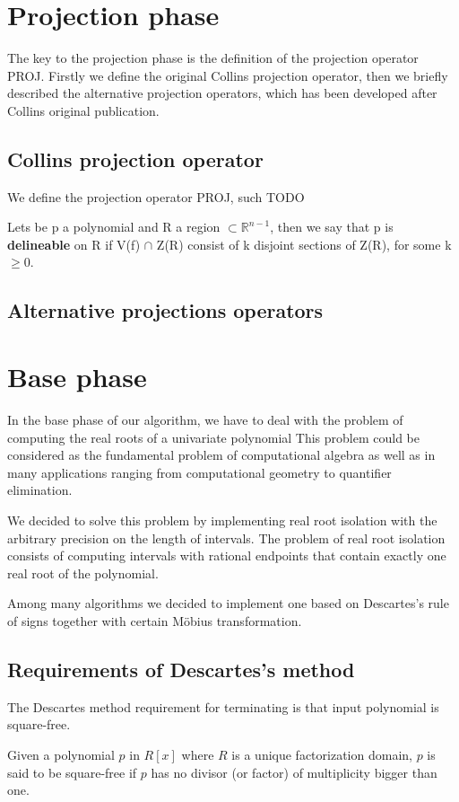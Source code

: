 \documentclass[
  digital, %
  twoside, %
  table,   %
  nolof,     %
  nolot,     %
]{fithesis3}
\begin{document}
\section{Projection phase}
The key to the projection phase is the definition of the projection operator PROJ. Firstly we define the original Collins projection operator, then we briefly described the alternative projection operators, which has been developed after Collins original publication.
\subsection{Collins projection operator}
We define the projection operator PROJ, such TODO 

\begin{definition}
Lets be p a polynomial and R a region $\subset \mathbb{R}^{n-1}$, then we say that p is \textbf{delineable} on R if  V(f) $\cap$ Z(R) consist of k disjoint sections of Z(R), for some k $\geq 0$.
\end{definition}


\subsection{Alternative projections operators}



\section{Base phase}
In the base phase of our algorithm, we have to deal with the problem of computing the real roots of a univariate polynomial This problem  could be considered as the fundamental problem of computational algebra\parencite{yap2000fundamental} as well as in many applications ranging from computational geometry to quantifier elimination. 

We decided to solve this problem by implementing real root isolation with the arbitrary precision on the length of intervals. The problem of real root isolation consists of computing intervals with rational endpoints that contain exactly one real root of the polynomial.\parencite{10.1007/11841036_72}

Among many algorithms we decided to implement one based on Descartes's rule of signs together with certain Möbius transformation.

 \subsection{Requirements of Descartes's method}
 The Descartes method requirement for terminating is that input polynomial is square-free.\parencite{ganzha2005computer}
  \begin{definition}
 Given a polynomial $p$ in $R[x]$ where $R$ is a unique factorization domain, $p$ is said to be square-free if $p$ has no divisor (or factor) of multiplicity bigger than one.\parencite{Yun:1976:SDA:800205.806320}
\end{definition}
\end{document}
